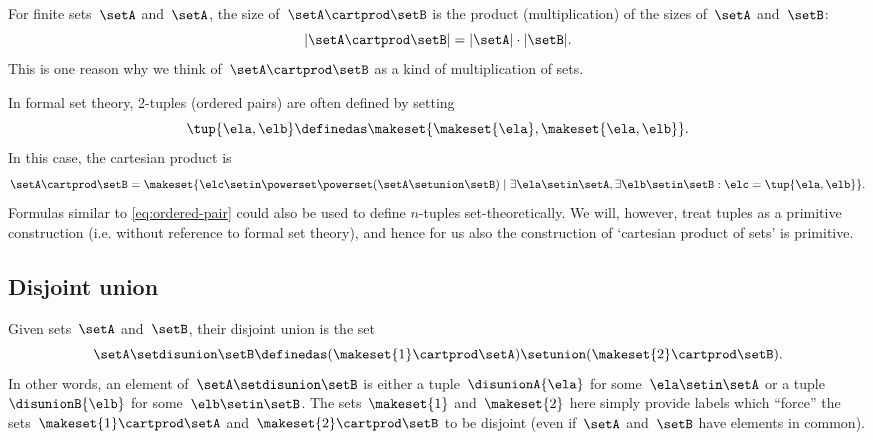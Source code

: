\begin{remark}
    For finite sets~$\setA$ and~$\setA$, the size of~$\setA \cartprod \setB$ is the product (multiplication) of the sizes of~$\setA$ and~$\setB$:
    \begin{equation*}
        \vert \setA \cartprod \setB \vert = \vert \setA \vert \cdot \vert \setB \vert.
    \end{equation*}
    This is one reason why we think of~$\setA \cartprod \setB$ as a kind of multiplication of sets.
\end{remark}

\begin{remark}
    In formal set theory, 2-tuples (ordered pairs) are often defined by setting
    \begin{equation}
        \label{eq:ordered-pair}
        \tup{\ela, \elb} \definedas \makeset{ \makeset{\ela } , \makeset{ \ela, \elb } }.
    \end{equation}
    In this case, the cartesian product is
    \begin{equation*}
        \setA \cartprod \setB = \makeset{ \elc \setin\powerset \powerset (\setA \setunion \setB) \mid \exists \ela \setin\setA, \exists \elb \setin\setB : \elc = \tup{\ela, \elb} }.
    \end{equation*}
    Formulas similar to \cref{eq:ordered-pair} could also be used to define $n$-tuples set-theoretically.
    We will, however, treat tuples as a primitive construction (i.e. without reference to formal set theory), and hence for us also the construction of `cartesian product of sets' is primitive.
\end{remark}

\subsection{Disjoint union}
\label{sec:disjoint-union}

Given sets~$\setA$ and~$\setB$, their disjoint union is the set
\begin{equation*}
    \setA \setdisunion \setB \definedas (  \makeset{ 1 } \cartprod \setA) \setunion ( \makeset{2}  \cartprod \setB).
\end{equation*}
In other words, an element of~$\setA \setdisunion \setB$ is either a tuple~$\disunionA{\ela}$ for some~$\ela \setin\setA$ or a tuple $\disunionB{\elb}$ for some~$\elb \setin\setB$.
The sets~$\makeset{ 1 }$ and~$\makeset{2}$ here simply provide labels which ``force'' the sets~$\makeset{ 1 }  \cartprod \setA$ and~$ \makeset{2}  \cartprod \setB$ to be disjoint (even if~$\setA$ and~$\setB$ have elements in common).

